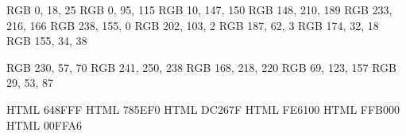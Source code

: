 

\definecolor{RichBlackFOGRA}  {RGB}  {  0,  18,  25}
\definecolor{BlueSapphire}    {RGB}  {  0,  95, 115}
\definecolor{ViridianGreen}   {RGB}  { 10, 147, 150}
\definecolor{MiddleBlueGreen} {RGB}  {148, 210, 189}
\definecolor{MediumChampagne} {RGB}  {233, 216, 166}
\definecolor{Gamboge}         {RGB}  {238, 155,   0}
\definecolor{AlloyOrange}     {RGB}  {202, 103,   2}
\definecolor{Mahogany}        {RGB}  {187,  62,   3}
\definecolor{Rufous}          {RGB}  {174,  32,  18}
\definecolor{RubyRed}         {RGB}  {155,  34,  38}


\definecolor{ImperialRed}     {RGB}  {230,  57,  70}
\definecolor{Honeydew}        {RGB}  {241, 250, 238}
\definecolor{PowderBlue}      {RGB}  {168, 218, 220}
\definecolor{CeladonBlue}     {RGB}  { 69, 123, 157}
\definecolor{PrussianBlue}    {RGB}  { 29,  53,  87}


\definecolor{CornflowerBlue}  {HTML} {648FFF}
\definecolor{MediumSlateBlue} {HTML} {785EF0}
\definecolor{MexicanPink}     {HTML} {DC267F}
\definecolor{OrangePantone}   {HTML} {FE6100}
\definecolor{SelectiveYellow} {HTML} {FFB000}
\definecolor{Aquamarine}      {HTML} {00FFA6}
